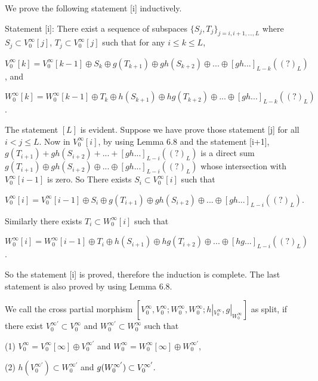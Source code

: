 \def\CTEXPreproc{Created by ctex v0.2.12, don't edit!}\documentclass[11pt]{article}
\begin{document}
\begin{pf} We prove the following statement [i] inductively.

Statement [i]:  There exist a sequence of subspaces $\{ S_j ,T_j  \}_{j=i,i+1 ,...,L }$ where $ S_j \subset V^{\infty}_0 [j]  $,
$ T_j \subset V^{\infty}_0 [j] $ such that for any $i\leq k \leq L$,

$V^{\infty}_0 [k]= V^{\infty}_0 [k-1]\oplus S_k \oplus g( T_{k+1} ) \oplus gh( S_{k+2} ) \oplus ...\oplus [gh...]_{L-k}(  (?)_L  )  $, and

$W^{\infty}_0 [k]= W^{\infty}_0 [k-1]\oplus T_k \oplus h( S_{k+1} ) \oplus hg( T_{k+2} ) \oplus ...\oplus [gh...]_{L-k}(  (?)_L  )  $.

The statement $[L]$ is evident. Suppose we have prove those statement [j] for all $i<j\leq L$. Now in $ V^{\infty}_0[i] $, by using Lemma 6.8 and the statement [i+1], $ g( T_{i+1} ) + gh( S_{i+2} ) + ...+ [gh...]_{L-i}(  (?)_L  )   $ is a direct sum
$  g( T_{i+1} ) \oplus gh( S_{i+2} ) \oplus ...\oplus [gh...]_{L-i}(  (?)_L  )  $ whose intersection with $ V^{\infty}_0[i-1] $ is zero. So There exists $ S_i \subset V^{\infty}_0 [i] $ such that

$V^{\infty}_0 [i]= V^{\infty}_0 [i-1]\oplus S_i \oplus g( T_{i+1} ) \oplus gh( S_{i+2} ) \oplus ...\oplus [gh...]_{L-i}(  (?)_L  )  $.

Similarly there exists $T_i \subset W^{\infty}_0[i] $ such that

$W^{\infty}_0 [i]= W^{\infty}_0 [i-1]\oplus T_i \oplus h( S_{i+1} ) \oplus hg( T_{i+2} ) \oplus ...\oplus [hg...]_{L-i}(  (?)_L  ) $.

So the statement [i] is proved, therefore the induction is complete. The last statement is also proved by using  Lemma 6.8. \\

\end{pf}

We call the cross partial morphism $ [V^{\infty}_0 , V^{\infty}_0 ; W^{\infty} _0 , W^{\infty}_0 ; h|_{V^{\infty}_0 } , g|_{W^{\infty}_0}  ] $ as split, if there exist $ V^{\infty '} _0 \subset V^{\infty}_0  $ and $ W^{\infty '} _0 \subset W^{\infty}_0   $ such that

\noindent(1) $V^{\infty}_0 = V^{\infty}_{0}[\infty] \oplus  V^{\infty '} _0$ and $W^{\infty}_0 = W^{\infty}_{0}[\infty] \oplus  W^{\infty '} _0$,

\noindent(2) $h (  V^{\infty '} _0   ) \subset W^{\infty '} _0  $  and $g(  W^{\infty '} _0   ) \subset V^{\infty '} _0 . \\$
\end{document}
